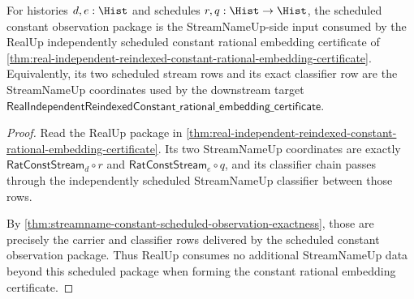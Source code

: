 \begin{theorem}
\label{thm:streamname-constant-scheduled-real-feed}
For histories $d,e:\Hist$ and schedules $r,q:\Hist\to\Hist$, the scheduled
constant observation package is the StreamNameUp-side input consumed by the
RealUp independently scheduled constant rational embedding certificate of
\autoref{thm:real-independent-reindexed-constant-rational-embedding-certificate}.
Equivalently, its two scheduled stream rows and its exact classifier row are
the StreamNameUp coordinates used by the downstream target
$\mathsf{RealIndependentReindexedConstant\_rational\_embedding\_certificate}$.
\end{theorem}
\begin{proof}
Read the RealUp package in
\autoref{thm:real-independent-reindexed-constant-rational-embedding-certificate}.
Its two StreamNameUp coordinates are exactly
$\mathsf{RatConstStream}_d\circ r$ and
$\mathsf{RatConstStream}_e\circ q$, and its classifier chain passes through
the independently scheduled StreamNameUp classifier between those rows.

By \autoref{thm:streamname-constant-scheduled-observation-exactness}, those
are precisely the carrier and classifier rows delivered by the scheduled
constant observation package. Thus RealUp consumes no additional StreamNameUp
data beyond this scheduled package when forming the constant rational
embedding certificate.
\end{proof}

